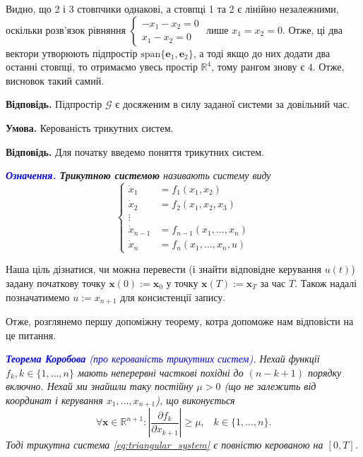 \documentclass[oneside,solution]{karazin-control-assign}
\begin{document}
Видно, що 2 і 3 стовпчики однакові, а стовпці 1 та 2 є лінійно незалежними, оскільки розв'язок рівняння $\begin{cases}
    -x_1-x_2 = 0 \\
    x_1-x_2=0
\end{cases}$ лише $x_1=x_2=0$. Отже, ці два вектори утворюють підпростір $\text{span}\{\mathbf{e}_1,\mathbf{e}_2\}$, а тоді якщо до них додати два останні стовпці, то отримаємо увесь простір $\mathbb{R}^4$, тому рангом знову є $4$. Отже, висновок такий самий.

\textbf{Відповідь.} Підпростір $\mathcal{G}$ є досяженим в силу заданої системи за довільний час.


\hspace{20px}\textbf{Умова.} Керованість трикутних систем.
\vspace{10px}

\textbf{Відповідь.} Для початку введемо поняття трикутних систем.

\textit{\textcolor{blue}{\textbf{Означення.}} \textbf{Трикутною системою} називають систему виду}
\begin{equation}\label{eq:triangular_system}
    \begin{cases}
        \dot{x}_1 &= f_1(x_1,x_2) \\
        \dot{x}_2 &= f_2(x_1,x_2,x_3) \\
        \vdots \\
        \dot{x}_{n-1}&=f_{n-1}(x_1,\dots,x_n) \\
        \dot{x}_n &= f_n(x_1,\dots,x_n,u)
    \end{cases}
\end{equation}

Наша ціль дізнатися, чи можна перевести (і знайти відповідне керування $u(t)$) задану початкову точку $\mathbf{x}(0):=\mathbf{x}_0$ у точку $\mathbf{x}(T):=\mathbf{x}_T$ за час $T$. Також надалі позначатимемо $u:=x_{n+1}$ для консистенції запису.

Отже, розглянемо першу допоміжну теорему, котра допоможе нам відповісти на це питання.

\textit{\textcolor{blue}{\textbf{Теорема Коробова} (про керованість трикутних систем).} Нехай функції $f_k, k \in \{1,\dots,n\}$ мають неперервні часткові похідні до $(n-k+1)$ порядку включно. Нехай ми знайшли таку постійну $\mu > 0$ (що не залежить від координат і керування $x_1,\dots,x_{n+1}$), що виконується}
\begin{equation}
    \forall \mathbf{x} \in \mathbb{R}^{n+1}: \left|\frac{\partial f_k}{\partial x_{k+1}}\right| \geq \mu, \;\;\; k \in \{1,\dots,n\}.
\end{equation}
\textit{Тоді трикутна система \ref{eq:triangular_system} є повністю керованою на $[0,T]$.}
\end{document}
